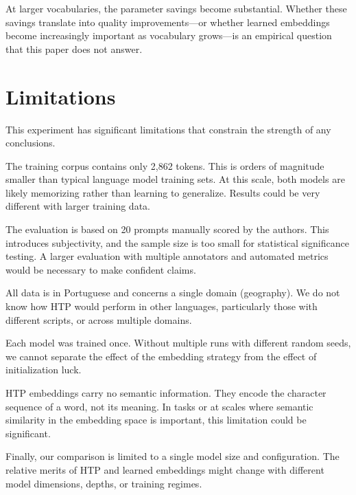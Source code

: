 \documentclass[10pt,twocolumn,a4paper]{article}
\newcommand{\htpname}{HTP}
\begin{document}
At larger vocabularies, the parameter savings become substantial. Whether these savings translate into quality improvements---or whether learned embeddings become increasingly important as vocabulary grows---is an empirical question that this paper does not answer.

\section{Limitations}
\label{sec:limitations}

This experiment has significant limitations that constrain the strength of any conclusions.

The training corpus contains only 2,862 tokens. This is orders of magnitude smaller than typical language model training sets. At this scale, both models are likely memorizing rather than learning to generalize. Results could be very different with larger training data.

The evaluation is based on 20 prompts manually scored by the authors. This introduces subjectivity, and the sample size is too small for statistical significance testing. A larger evaluation with multiple annotators and automated metrics would be necessary to make confident claims.

All data is in Portuguese and concerns a single domain (geography). We do not know how \htpname{} would perform in other languages, particularly those with different scripts, or across multiple domains.

Each model was trained once. Without multiple runs with different random seeds, we cannot separate the effect of the embedding strategy from the effect of initialization luck.

\htpname{} embeddings carry no semantic information. They encode the character sequence of a word, not its meaning. In tasks or at scales where semantic similarity in the embedding space is important, this limitation could be significant.

Finally, our comparison is limited to a single model size and configuration. The relative merits of \htpname{} and learned embeddings might change with different model dimensions, depths, or training regimes.

\end{document}
